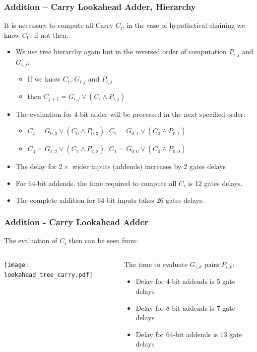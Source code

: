 \documentclass{beamer}
\begin{document}
\begin{frame}
\frametitle{Addition -- Carry Lookahead Adder, Hierarchy}

It is necessary to compute all Carry $C_i$, in the case of hypothetical chaining we know $C_0$, if not then:
\begin{itemize}
\item We use tree hierarchy again but in the reversed order of computation $P_{i,j}$ and $G_{i,j}$:
\begin{itemize}
\item If we know $C_i$, $G_{i,j}$ and $P_{i,j}$
\item then $C_{j+1} = G_{i,j} \lor (C_i \land P_{i,j})$ 
\end{itemize}
\item The evaluation for 4-bit adder will be processed in the next specified order:
\begin{itemize}
\item $C_4 = G_{0,3} \lor (C_0 \land P_{0,3})$, $C_2 = G_{0,1} \lor (C_0 \land P_{0,1})$
\item $C_3 = G_{2,2} \lor (C_2 \land P_{2,2})$, $C_1 = G_{0,0} \lor (C_0 \land P_{0,0})$
\end{itemize}
\item The delay for $2\times$ wider inputs (addends) increases by 2 gates delays 
\item For 64-bit addends, the time required to compute all $C_i$ is 12 gates delays.
\item The complete addition for 64-bit inputs takes 26 gates delays.
\end{itemize}

\end{frame}


\begin{frame}
\frametitle{Addition - Carry Lookahead Adder}

The evaluation of $C_i$ then can be seen from:
\begin{columns}
\begin{column}{0.5\textwidth}
\begin{center}
   \texttt{[image: lookahead\_tree\_carry.pdf]}
\end{center}
\end{column}
\begin{column}{0.5\textwidth}

The time to evaluate $G_{i,k}$ pairs $P_{i,k}$:
\begin{itemize}
\item Delay for 4-bit addends is 5 gate delays
\item Delay for 8-bit addends is 7 gate delays
\item Delay for 64-bit addends is 13 gate delays
\end{itemize}

\end{column}
\end{columns}

\end{frame}
\end{document}
